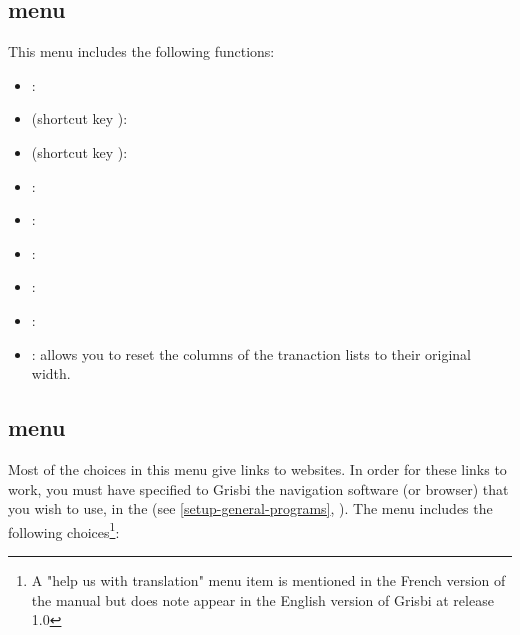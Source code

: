 \subsection{ menu\label{home-menus-display}}

This menu includes the following functions: 

\begin{itemize}
	 \item {}: 
	 \item {} (shortcut key ):
	 \item {} (shortcut key ):
	 \item {}:
	 \item {}:
	 \item {}:
	 \item {}:
	 \item {}:
	 \item {}: allows you to reset the columns of the tranaction lists to their original width.
\end{itemize}


\subsection{ menu\label{home-menus-help}}

Most of the choices in this menu give links to websites. In order for these links to work, you must have specified to Grisbi the navigation software (or browser) that you wish to use, in the  (see \vref{setup-general-programs}, ). The  menu includes the following choices\footnote{ A "help us with translation" menu item is mentioned in the French version of the manual but does note appear in the English version of Grisbi at release 1.0}:

